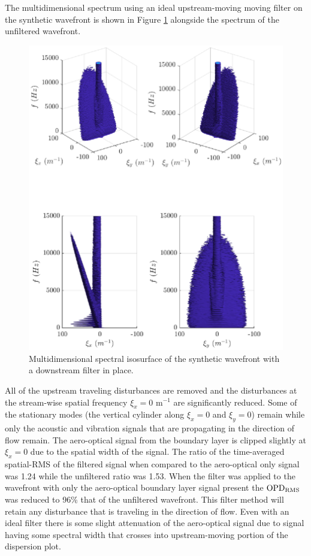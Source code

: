 The multidimensional spectrum using an ideal upstream-moving moving filter on the synthetic wavefront is shown in Figure \ref{fig:06_filter_downstream} alongside the spectrum of the unfiltered wavefront.
\begin{figure}
 \centering
 \includegraphics{../matlab/06_single_sensor_filtering/filter_downstream.eps}
 \caption{Multidimensional spectral isosurface of the synthetic wavefront with a downstream filter in place.}
 \label{fig:06_filter_downstream}
\end{figure}
All of the upstream traveling disturbances are removed and the disturbances at the stream-wise spatial frequency $\xi_x=0$ m$^{-1}$ are significantly reduced.
Some of the stationary modes (the vertical cylinder along $\xi_x=0$ and $\xi_y=0$) remain while only the acoustic and vibration signals that are propagating in the direction of flow remain.
The aero-optical signal from the boundary layer is clipped slightly at $\xi_x=0$ due to the spatial width of the signal.
The ratio of the time-averaged spatial-RMS of the filtered signal when compared to the aero-optical only signal was 1.24 while the unfiltered ratio was 1.53.
When the filter was applied to the wavefront with only the aero-optical boundary layer signal present the $\operatorname{OPD_{RMS}}$ was reduced to 96\% that of the unfiltered wavefront.
This filter method will retain any disturbance that is traveling in the direction of flow.
Even with an ideal filter there is some slight attenuation of the aero-optical signal due to signal having some spectral width that crosses into upstream-moving portion of the dispersion plot.


